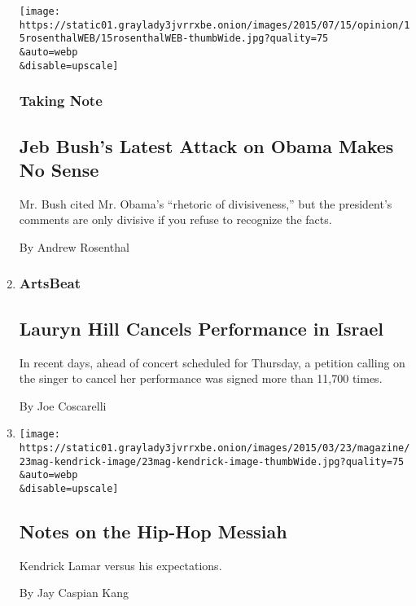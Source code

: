 \begin{enumerate}
  \texttt{[image: https://static01.graylady3jvrrxbe.onion/images/2015/07/15/opinion/15rosenthalWEB/15rosenthalWEB-thumbWide.jpg?quality=75\\\&auto=webp\\\&disable=upscale]}

  \hypertarget{taking-note}{%
  \subsubsection{Taking Note}\label{taking-note}}

  \hypertarget{jeb-bushs-latest-attack-on-obama-makes-no-sense}{%
  \subsection{Jeb Bush's Latest Attack on Obama Makes No
  Sense}\label{jeb-bushs-latest-attack-on-obama-makes-no-sense}}

  Mr. Bush cited Mr. Obama's ``rhetoric of divisiveness,'' but the
  president's comments are only divisive if you refuse to recognize the
  facts.

  By Andrew Rosenthal
\item
  \href{https://artsbeat.blogs.nytimes3xbfgragh.onion/2015/05/04/lauryn-hill-cancels-performance-in-israel/}{}

  \hypertarget{artsbeat}{%
  \subsubsection{ArtsBeat}\label{artsbeat}}

  \hypertarget{lauryn-hill-cancels-performance-in-israel}{%
  \subsection{Lauryn Hill Cancels Performance in
  Israel}\label{lauryn-hill-cancels-performance-in-israel}}

  In recent days, ahead of concert scheduled for Thursday, a petition
  calling on the singer to cancel her performance was signed more than
  11,700 times.

  By Joe Coscarelli
\item
  \href{/2015/03/24/magazine/notes-on-the-hip-hop-messiah.html}{}

  \texttt{[image: https://static01.graylady3jvrrxbe.onion/images/2015/03/23/magazine/23mag-kendrick-image/23mag-kendrick-image-thumbWide.jpg?quality=75\\\&auto=webp\\\&disable=upscale]}

  \hypertarget{notes-on-the-hip-hop-messiah}{%
  \subsection{Notes on the Hip-Hop
  Messiah}\label{notes-on-the-hip-hop-messiah}}

  Kendrick Lamar versus his expectations.

  By Jay Caspian Kang
\end{enumerate}

